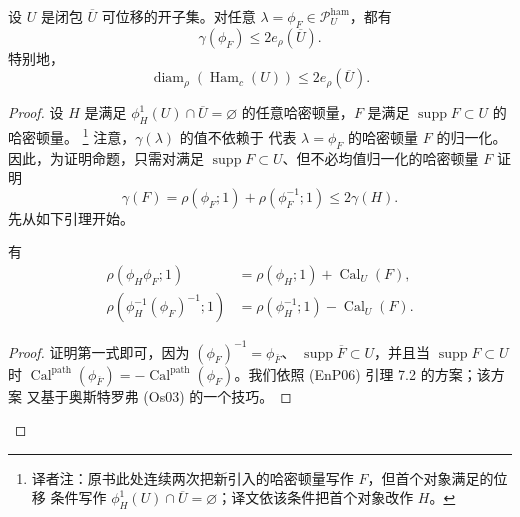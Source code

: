 \begin{proposition}[与 (EnP06) 引理 7.2 比较]
\label{prop:22-displaceable-spectral-diameter}
设 $U$ 是闭包 $\overline U$ 可位移的开子集。对任意
$\lambda=\phi_F\in\mathcal P_U^{\mathrm{ham}}$，都有
\[
 \gamma(\phi_F)\leq2e_\rho(\overline U).
\]
特别地，
\[
 \operatorname{diam}_\rho(\operatorname{Ham}_c(U))\leq2e_\rho(\overline U).
\]
\end{proposition}

\begin{proof}
设 $H$ 是满足 $\phi_H^1(U)\cap\overline U=\varnothing$ 的任意哈密顿量，$F$ 是满足
$\operatorname{supp}F\subset U$ 的哈密顿量。
\footnote{译者注：原书此处连续两次把新引入的哈密顿量写作 $F$，但首个对象满足的位移
条件写作 $\phi_H^1(U)\cap\overline U=\varnothing$；译文依该条件把首个对象改作 $H$。}
注意，$\gamma(\lambda)$ 的值不依赖于
代表 $\lambda=\phi_F$ 的哈密顿量 $F$ 的归一化。因此，为证明命题，只需对满足
$\operatorname{supp}F\subset U$、但不必均值归一化的哈密顿量 $F$ 证明
\begin{equation}
 \gamma(F)=\rho(\phi_F;1)+\rho(\phi_F^{-1};1)\leq2\gamma(H).
 \label{eq:22-local-gamma-bound}
\end{equation}
先从如下引理开始。

\begin{lemma}
\label{lem:22-calabi-spectral-shift}
有
\[
 \begin{aligned}
 \rho(\phi_H\phi_F;1)&=\rho(\phi_H;1)+\operatorname{Cal}_U(F),\\
 \rho(\phi_H^{-1}(\phi_F)^{-1};1)
 &=\rho(\phi_H^{-1};1)-\operatorname{Cal}_U(F).
 \end{aligned}
\]
\end{lemma}

\begin{proof}
证明第一式即可，因为 $(\phi_F)^{-1}=\phi_{\overline F}$、
$\operatorname{supp}\overline F\subset U$，并且当 $\operatorname{supp}F\subset U$ 时
$\operatorname{Cal}^{\mathrm{path}}(\phi_{\overline F})
=-\operatorname{Cal}^{\mathrm{path}}(\phi_F)$。我们依照 (EnP06) 引理 7.2 的方案；该方案
又基于奥斯特罗弗 (Os03) 的一个技巧。


\end{proof}
\end{proof}
